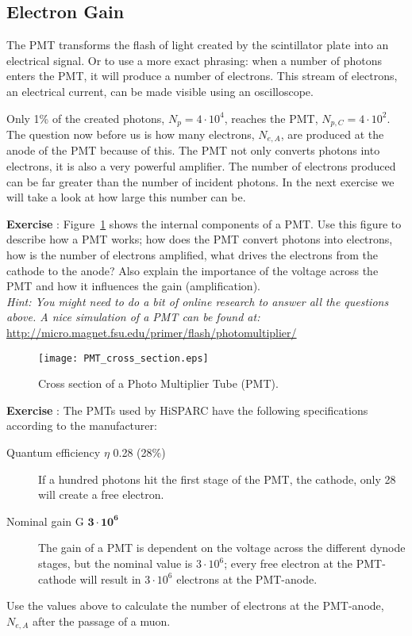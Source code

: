 \subsection{Electron Gain}
The PMT transforms the flash of light created by the scintillator plate into an electrical signal. Or to use a more exact phrasing: when a number of photons enters the PMT, it will produce a number of electrons. This stream of electrons, an electrical current, can be made visible using an oscilloscope.

Only 1\% of the created photons, $N_p=4 \cdot 10^4$, reaches the PMT, $N_{p,C}=4 \cdot 10^2$. The question now before us is how many electrons, $N_{e,A}$, are produced at the anode of the PMT because of this. The PMT not only converts photons into electrons, it is also a very powerful amplifier. The number of electrons produced can be far greater than the number of incident photons. In the next exercise we will take a look at how large this number can be.

\begin{shaded}
\textbf{Exercise \theExercise {}} : Figure~\ref{fig:PMT_cross_section} shows the internal components of a PMT. Use this figure to describe how a PMT works; how does the PMT convert photons into electrons, how is the number of electrons amplified, what drives the electrons from the cathode to the anode? Also explain the importance of the voltage across the PMT and how it influences the gain (amplification).\\
\emph{Hint: You might need to do a bit of online research to answer all the questions above. A nice simulation of a PMT can be found at:\\}
\url{http://micro.magnet.fsu.edu/primer/flash/photomultiplier/}
\end{shaded}

\begin{figure}\begin{center}
\texttt{[image: PMT\_cross\_section.eps]}%
\caption{Cross section of a Photo Multiplier Tube (PMT).}\label{fig:PMT_cross_section}
\end{center}\end{figure}

\begin{shaded}
\textbf{Exercise \theExercise {}} : The PMTs used by HiSPARC have the following specifications according to the manufacturer:
\begin{description}
\item [Quantum efficiency $\eta$ 0.28 (28\%)] If a hundred photons hit the first stage of the PMT, the cathode, only 28 will create a free electron.
\item [Nominal gain G $ \mathbf{3 \cdot 10^6}$] The gain of a PMT is dependent on the voltage across the different dynode stages, but the nominal value is $3 \cdot 10^6$; every free electron at the PMT-cathode will result in $3 \cdot 10^6$ electrons at the PMT-anode.
\end{description}
Use the values above to calculate the number of electrons at the PMT-anode, $N_{e,A}$ after the passage of a muon.
\end{shaded}

